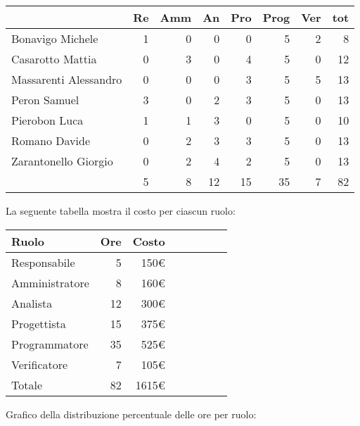 \begin{table}[H]
    \begin{tabularx}{\linewidth}{X|rrrrrrr}
    \rowcolor{gray!30}& Re & Amm & An & Pro & Prog & Ver & tot \\
    \hline
    Bonavigo Michele                        & 1 & 0 & 0 & 0 & 5 & 2 & 8 \\
    \rowcolor{gray!10}Casarotto Mattia      & 0 & 3 & 0 & 4 & 5 & 0 & 12 \\
    Massarenti Alessandro                   & 0 & 0 & 0 & 3 & 5 & 5 & 13 \\
    \rowcolor{gray!10}Peron Samuel          & 3 & 0 & 2 & 3 & 5 & 0 & 13 \\
    Pierobon Luca                           & 1 & 1 & 3 & 0 & 5 & 0 & 10 \\
    \rowcolor{gray!10}Romano Davide         & 0 & 2 & 3 & 3 & 5 & 0 & 13 \\
    Zarantonello Giorgio                    & 0 & 2 & 4 & 2 & 5 & 0 & 13 \\
    \hline                                  & 5 & 8 & 12 & 15 & 35 & 7 & 82 \\ 
    \end{tabularx}
\end{table}

La seguente tabella mostra il costo per ciascun ruolo:
\begin{table}[H]
    \begin{tabularx}{\linewidth}{X|rrrrrrr}
    \rowcolor{gray!30}Ruolo & Ore & Costo \\
    \hline
    Responsabile                            & 5  & 150€ \\
    \rowcolor{gray!10}Amministratore        & 8  & 160€ \\
    Analista                                & 12  & 300€ \\
    \rowcolor{gray!10}Progettista           & 15  & 375€ \\
    Programmatore                           & 35  & 525€ \\
    \rowcolor{gray!10}Verificatore          & 7  & 105€ \\
    \hline Totale                           & 82  & 1615€ \\ 
    \end{tabularx}
\end{table}

Grafico della distribuzione percentuale delle ore per ruolo:
\begin{center}
\end{center}

